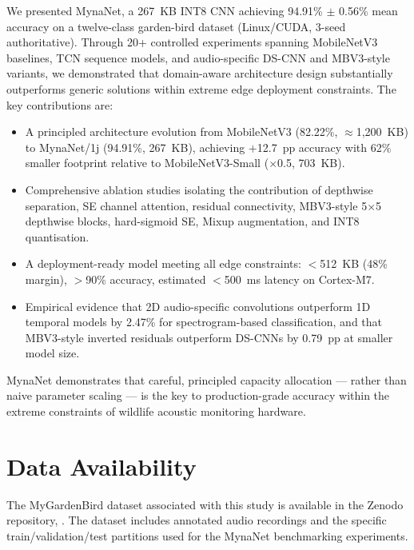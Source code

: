 \documentclass[final,5p,times,twocolumn,nolinenum]{elsarticle}
\begin{document}
We presented MynaNet, a 267~KB INT8 CNN achieving 94.91\% $\pm$ 0.56\%
mean accuracy on a twelve-class garden-bird dataset (Linux/CUDA, 3-seed
authoritative). Through 20+ controlled experiments spanning MobileNetV3
baselines, TCN sequence models, and audio-specific DS-CNN and MBV3-style
variants, we demonstrated that domain-aware architecture design substantially
outperforms generic solutions within extreme edge deployment constraints.
The key contributions are:

\begin{itemize}
  \item A principled architecture evolution from MobileNetV3 (82.22\%,
        $\approx$1{,}200~KB) to MynaNet/1j (94.91\%, 267~KB), achieving
        $+$12.7~pp accuracy with 62\% smaller footprint relative to
        MobileNetV3-Small ($\times$0.5, 703~KB).
  \item Comprehensive ablation studies isolating the contribution of
        depthwise separation, SE channel attention, residual connectivity,
        MBV3-style 5$\times$5 depthwise blocks, hard-sigmoid SE, Mixup
        augmentation, and INT8 quantisation.
  \item A deployment-ready model meeting all edge constraints:
        $<$512~KB (48\% margin), $>$90\% accuracy, estimated $<$500~ms
        latency on Cortex-M7.
  \item Empirical evidence that 2D audio-specific convolutions outperform
        1D temporal models by 2.47\% for spectrogram-based classification,
        and that MBV3-style inverted residuals outperform DS-CNNs by
        0.79~pp at smaller model size.
\end{itemize}

MynaNet demonstrates that careful, principled capacity allocation ---
rather than naive parameter scaling --- is the key to production-grade
accuracy within the extreme constraints of wildlife acoustic monitoring
hardware.

\section*{Data Availability}
\label{sec:data_availability}

The MyGardenBird dataset associated with this study is available in the Zenodo repository, \cite{zabidi2026dataset}. The dataset includes annotated audio recordings and the specific train/validation/test partitions used for the MynaNet benchmarking experiments.
\end{document}
